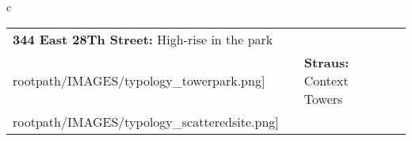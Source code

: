\begin{table}[H]
        \begin{tabular}{c}
        \begin{tabular}{m{1.25in} m{2in} m{.1in} m{1.25in} m{2in}}
\textbf{344 East 28Th Street:} {High-rise in the park} & \texttt{[image: \\rootpath/IMAGES/typology\_towerpark.png]} & & \textbf{Straus:} {Context Towers} & \texttt{[image: \\rootpath/IMAGES/typology\_scatteredsite.png]}
\end{tabular}\end{tabular}
        \end{table}